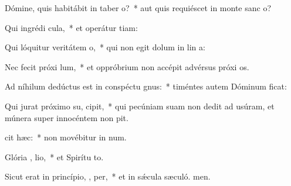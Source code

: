 \item Dómine, quis habitábit in taber o?~* aut quis requiéscet in monte sanc o?
\item Qui ingrédi  cula,~* et operátur tiam:
\item Qui lóquitur veritátem   o,~* qui non egit dolum in lin a:
\item Nec fecit próxi  lum,~* et oppróbrium non accépit advérsus próxi os.
\item Ad níhilum dedúctus est in conspéctu  gnus:~* timéntes autem Dóminum ficat:
\item Qui jurat próximo su,   cipit,~* qui pecúniam suam non dedit ad usúram, et múnera super innocéntem non pit.
\item {} cit hæc:~* non movébitur in num.
\item Glória ,  lio,~* et Spirítu to.
\item Sicut erat in princípio,  ,  per,~* et in sǽcula sæculó. men.
